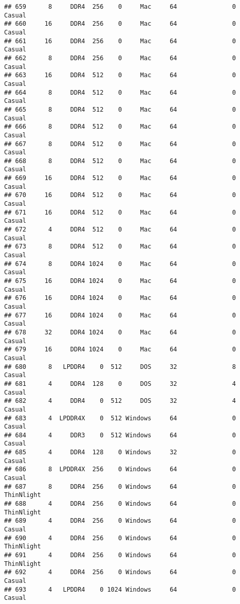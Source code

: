\documentclass[
]{article}
\begin{document}
\begin{verbatim}
## 659      8     DDR4  256    0     Mac     64               0     Casual
## 660     16     DDR4  256    0     Mac     64               0     Casual
## 661     16     DDR4  256    0     Mac     64               0     Casual
## 662      8     DDR4  256    0     Mac     64               0     Casual
## 663     16     DDR4  512    0     Mac     64               0     Casual
## 664      8     DDR4  512    0     Mac     64               0     Casual
## 665      8     DDR4  512    0     Mac     64               0     Casual
## 666      8     DDR4  512    0     Mac     64               0     Casual
## 667      8     DDR4  512    0     Mac     64               0     Casual
## 668      8     DDR4  512    0     Mac     64               0     Casual
## 669     16     DDR4  512    0     Mac     64               0     Casual
## 670     16     DDR4  512    0     Mac     64               0     Casual
## 671     16     DDR4  512    0     Mac     64               0     Casual
## 672      4     DDR4  512    0     Mac     64               0     Casual
## 673      8     DDR4  512    0     Mac     64               0     Casual
## 674      8     DDR4 1024    0     Mac     64               0     Casual
## 675     16     DDR4 1024    0     Mac     64               0     Casual
## 676     16     DDR4 1024    0     Mac     64               0     Casual
## 677     16     DDR4 1024    0     Mac     64               0     Casual
## 678     32     DDR4 1024    0     Mac     64               0     Casual
## 679     16     DDR4 1024    0     Mac     64               0     Casual
## 680      8   LPDDR4    0  512     DOS     32               8     Casual
## 681      4     DDR4  128    0     DOS     32               4     Casual
## 682      4     DDR4    0  512     DOS     32               4     Casual
## 683      4  LPDDR4X    0  512 Windows     64               0     Casual
## 684      4     DDR3    0  512 Windows     64               0     Casual
## 685      4     DDR4  128    0 Windows     32               0     Casual
## 686      8  LPDDR4X  256    0 Windows     64               0     Casual
## 687      8     DDR4  256    0 Windows     64               0 ThinNlight
## 688      4     DDR4  256    0 Windows     64               0 ThinNlight
## 689      4     DDR4  256    0 Windows     64               0     Casual
## 690      4     DDR4  256    0 Windows     64               0 ThinNlight
## 691      4     DDR4  256    0 Windows     64               0 ThinNlight
## 692      4     DDR4  256    0 Windows     64               0     Casual
## 693      4   LPDDR4    0 1024 Windows     64               0     Casual

\end{verbatim}
\end{document}
